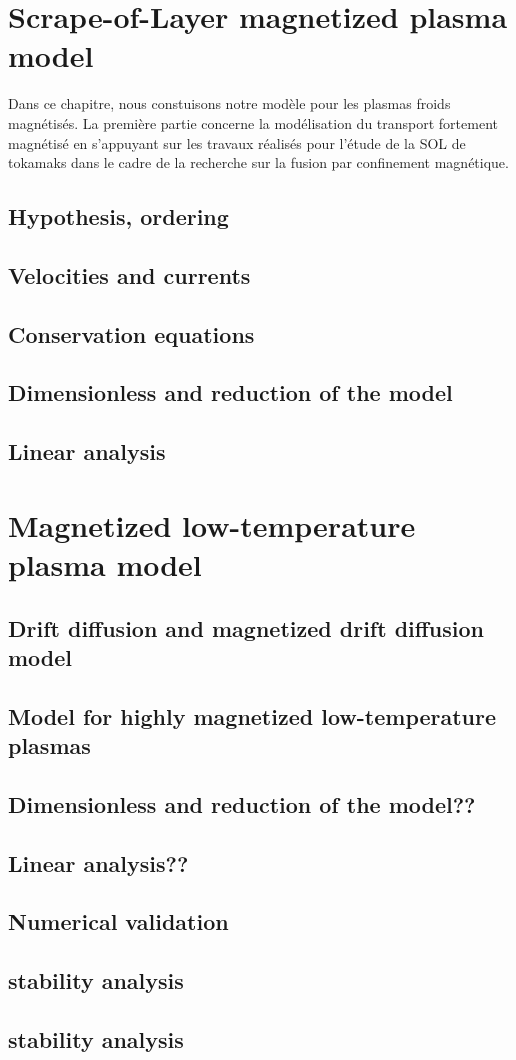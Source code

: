  
	
	\section{Scrape-of-Layer magnetized plasma model}
	Dans ce chapitre, nous constuisons notre modèle
pour les plasmas froids magnétisés. La première partie concerne la modélisation du transport
	fortement magnétisé en s'appuyant sur les travaux réalisés pour l'étude de la
	SOL de tokamaks dans le cadre de la recherche sur la fusion par confinement magnétique.
		\subsection{Hypothesis, ordering}
		\subsection{Velocities and currents}
		\subsection{Conservation equations}
		\subsection{Dimensionless and reduction of the model}
		\subsection{Linear analysis}
	\section{Magnetized low-temperature plasma model}
		\subsection{Drift diffusion and magnetized drift diffusion model}
		\subsection{Model for highly magnetized low-temperature plasmas}
		\subsection{Dimensionless and reduction of the model??}
		\subsection{Linear analysis??}
		\subsection{Numerical validation}
		\subsection{stability analysis}
		\subsection{stability analysis}
